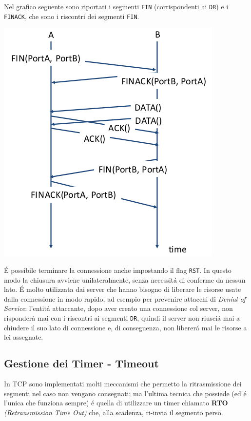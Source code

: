 \documentclass[12pt]{article}
\def\code#1{\texttt{#1}}
\begin{document}
Nel grafico seguente sono riportati i segmenti \code{FIN} (corrispondenti ai \code{DR}) e i \code{FINACK}, che sono
i riscontri dei segmenti \code{FIN}.
\begin{center}
	\includegraphics[scale=0.4]{livello_trasporto-img4.png}
\end{center}

\'E possibile terminare la connessione anche impostando il flag \code{RST}. In questo modo la chiusura avviene 
unilateralmente, senza necessit\'a di conferme da nessun lato. \'E molto utilizzata dai server che hanno bisogno di 
liberare le risorse usate dalla connessione in modo rapido, ad esempio per prevenire attacchi di \textit{Denial of 
Service}: l'entit\'a attaccante, dopo aver creato una connessione col server, non risponder\'a mai con i riscontri ai  
segmenti \code{DR}, quindi il server non riusci\'a mai a chiudere il suo lato di connessione e, di conseguenza, non 
liberer\'a mai le risorse a lei assegnate.

\clearpage
\subsection{Gestione dei Timer - Timeout}\label{tcp-timeout}
In TCP sono implementati molti meccanismi che permetto la ritrasmissione dei segmenti nel caso non vengano 
consegnati; ma l'ultima tecnica che possiede (ed \'e l'unica che funziona sempre) \'e quella di utilizzare un timer
chiamato \textbf{RTO} \textit{(Retransmission Time Out)} che, alla scadenza, ri-invia il segmento perso.
\end{document}
